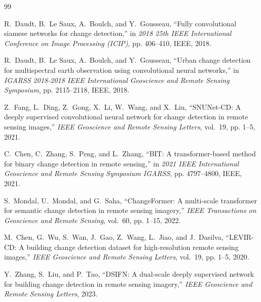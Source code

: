 \documentclass{IEEEtran}
\begin{document}
\begin{thebibliography}{99}

R.~Daudt, B.~Le Saux, A.~Boulch, and Y.~Gousseau, ``Fully convolutional siamese networks for change detection,'' in \textit{2018 25th IEEE International Conference on Image Processing (ICIP)}, pp. 406--410, IEEE, 2018.

R.~Daudt, B.~Le Saux, A.~Boulch, and Y.~Gousseau, ``Urban change detection for multispectral earth observation using convolutional neural networks,'' in \textit{IGARSS 2018-2018 IEEE International Geoscience and Remote Sensing Symposium}, pp. 2115--2118, IEEE, 2018.

Z.~Fang, L.~Ding, Z.~Gong, X.~Li, W.~Wang, and X.~Liu, ``SNUNet-CD: A deeply supervised convolutional neural network for change detection in remote sensing images,'' \textit{IEEE Geoscience and Remote Sensing Letters}, vol.~19, pp. 1--5, 2021.

C.~Chen, C.~Zhang, S.~Peng, and L.~Zhang, ``BIT: A transformer-based method for binary change detection in remote sensing,'' in \textit{2021 IEEE International Geoscience and Remote Sensing Symposium IGARSS}, pp. 4797--4800, IEEE, 2021.

S.~Mondal, U.~Mondal, and G.~Saha, ``ChangeFormer: A multi-scale transformer for semantic change detection in remote sensing imagery,'' \textit{IEEE Transactions on Geoscience and Remote Sensing}, vol.~60, pp. 1--15, 2022.

M.~Chen, G.~Wu, S.~Wan, J.~Gao, Z.~Wang, L.~Jiao, and J.~Dasilva, ``LEVIR-CD: A building change detection dataset for high-resolution remote sensing images,'' \textit{IEEE Geoscience and Remote Sensing Letters}, vol.~19, pp. 1--5, 2020.

Y.~Zhang, S.~Liu, and P.~Tao, ``DSIFN: A dual-scale deeply supervised network for building change detection in remote sensing imagery,'' \textit{IEEE Geoscience and Remote Sensing Letters}, 2023.

\end{thebibliography}
\end{document}
